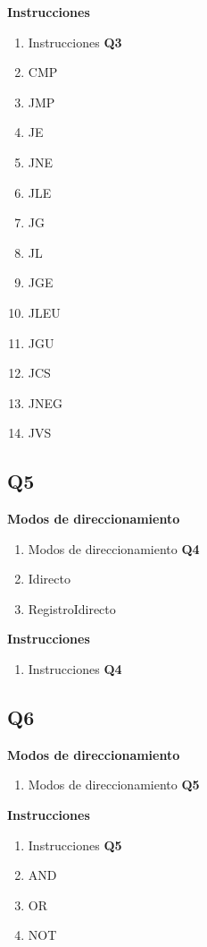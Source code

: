 \textbf{Instrucciones}
\begin{enumerate}
\item Instrucciones \textbf{Q3}
\item CMP
\item JMP
\item JE 
\item JNE 
\item JLE 
\item JG 
\item JL 
\item JGE 
\item JLEU 
\item JGU 
\item JCS 
\item JNEG 
\item JVS
\end{enumerate}

\subsection{Q5}

\textbf{Modos de direccionamiento}
\begin{enumerate}
\item Modos de direccionamiento \textbf{Q4}
\item Idirecto
\item RegistroIdirecto
\end{enumerate}

\textbf{Instrucciones}
\begin{enumerate}
\item Instrucciones \textbf{Q4}
\end{enumerate}

\subsection{Q6}

\textbf{Modos de direccionamiento}
\begin{enumerate}
\item Modos de direccionamiento \textbf{Q5}
\end{enumerate}

\textbf{Instrucciones}
\begin{enumerate}
\item Instrucciones \textbf{Q5}
\item AND
\item OR
\item NOT
\end{enumerate}



